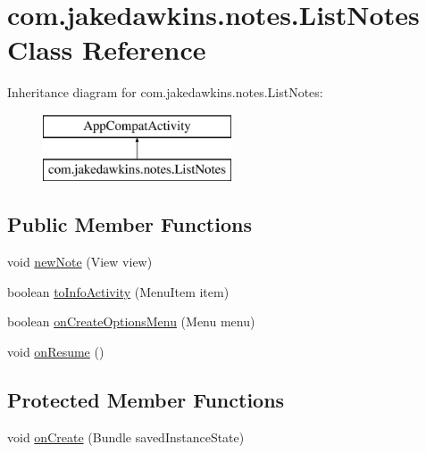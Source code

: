 \hypertarget{classcom_1_1jakedawkins_1_1notes_1_1_list_notes}{}\section{com.\+jakedawkins.\+notes.\+List\+Notes Class Reference}
\label{classcom_1_1jakedawkins_1_1notes_1_1_list_notes}
Inheritance diagram for com.\+jakedawkins.\+notes.\+List\+Notes\+:\begin{figure}[H]
\begin{center}
\leavevmode
\includegraphics[height=2.000000cm]{classcom_1_1jakedawkins_1_1notes_1_1_list_notes}
\end{center}
\end{figure}
\subsection*{Public Member Functions}
\begin{DoxyCompactItemize}
\item 
void \hyperlink{classcom_1_1jakedawkins_1_1notes_1_1_list_notes_a18e83462a551ec45bde3a6040267fdc8}{new\+Note} (View view)
\item 
boolean \hyperlink{classcom_1_1jakedawkins_1_1notes_1_1_list_notes_a6b4df66f8083efa67bae77294b2c6a6b}{to\+Info\+Activity} (Menu\+Item item)
\item 
boolean \hyperlink{classcom_1_1jakedawkins_1_1notes_1_1_list_notes_ac97485ae407d36a55b0c2994bbaaa228}{on\+Create\+Options\+Menu} (Menu menu)
\item 
void \hyperlink{classcom_1_1jakedawkins_1_1notes_1_1_list_notes_a78c2ab7f4a94ab8efbe36b1c9be81b60}{on\+Resume} ()
\end{DoxyCompactItemize}
\subsection*{Protected Member Functions}
\begin{DoxyCompactItemize}
\item 
void \hyperlink{classcom_1_1jakedawkins_1_1notes_1_1_list_notes_a39a41b19881da4d8ac90ac3bacbf95a1}{on\+Create} (Bundle saved\+Instance\+State)
\end{DoxyCompactItemize}


